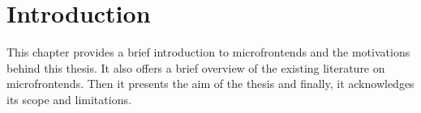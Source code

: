 \chapter{Introduction}
\label{chap:Introduction} 
This chapter provides a brief introduction to microfrontends and the motivations behind this thesis. It also offers a brief overview of the existing literature on microfrontends. Then it presents the aim of the thesis and finally, it acknowledges its scope and limitations.



